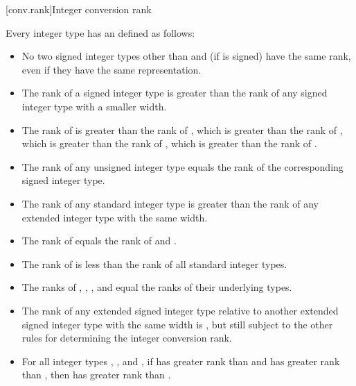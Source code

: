 [conv.rank]{Integer conversion rank}%

\pnum
Every integer type has an  defined as follows:

\begin{itemize}
\item No two signed integer types other than  and  (if  is signed) have the same rank, even if they have
the same representation.

\item The rank of a signed integer type is greater than the rank
of any signed integer type with a smaller width.

\item The rank of  is greater
than the rank of , which is greater than
the rank of , which is greater than the rank of
, which is greater than the rank of
.

\item The rank of any unsigned integer type equals the rank of the
corresponding signed integer type.

\item The rank of any standard integer type is greater than the
rank of any extended integer type with the same width.

\item The rank of  equals the rank of 
and .

\item The rank of  is less than the rank of all
standard integer types.

\item
{}%
%
%
The ranks of , , , and
 equal the ranks of their underlying
types.

\item The rank of any extended signed integer type relative to another
extended signed integer type with the same width is , but still subject to the other rules for determining the integer
conversion rank.

\item For all integer types , , and , if
 has greater rank than  and  has greater
rank than , then  has greater rank than
.
\end{itemize}

